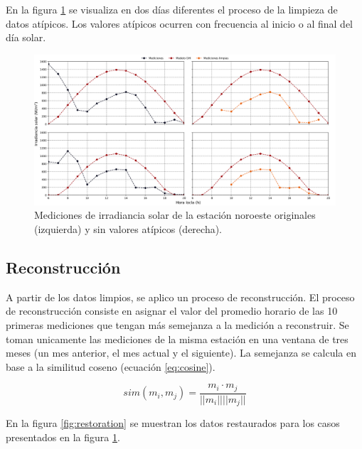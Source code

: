 En la figura \ref{fig:example_clean_data} se visualiza en dos días diferentes el proceso de la limpieza de datos atípicos. Los valores atípicos ocurren con frecuencia al inicio o al final del día solar.

\begin{figure}[H]
	\centering
	\includegraphics[width=15cm]{Graphics/example_clean_data.png}
	\caption{Mediciones de irradiancia solar de la estación noroeste originales (izquierda) y sin valores atípicos (derecha).}
	\label{fig:example_clean_data}
\end{figure}

\subsection{Reconstrucción}

A partir de los datos limpios, se aplico un proceso de reconstrucción. El proceso de reconstrucción consiste en asignar el valor del promedio horario de las 10 primeras mediciones que tengan más semejanza a la medición a reconstruir. Se toman unicamente las mediciones de la misma estación en una ventana de tres meses (un mes anterior, el mes actual y el siguiente). La semejanza se calcula en base a la similitud coseno (ecuación \ref{eq:cosine}).

\begin{equation}
	sim(m_i , m_j ) = \frac{m_i \cdot m_j}{||m_i|| ||m_j||}
	\label{eq:cosine}
\end{equation}

En la figura \ref{fig:restoration} se muestran los datos restaurados para los casos presentados en la figura \ref{fig:example_clean_data}.

